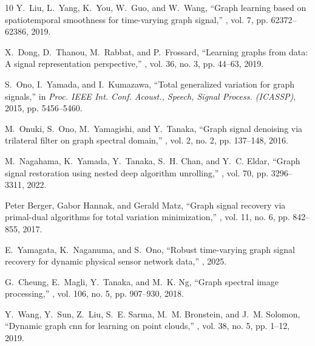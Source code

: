\documentclass[journal]{IEEEtran}
\begin{document}
\begin{thebibliography}{10}
    Y.~Liu, L.~Yang, K.~You, W.~Guo, and W.~Wang,
    \newblock ``Graph learning based on spatiotemporal smoothness for time-varying graph signal,''
    , vol. 7, pp. 62372--62386, 2019.
    
    X.~Dong, D.~Thanou, M.~Rabbat, and P.~Frossard,
    \newblock ``Learning graphs from data: A signal representation perspective,''
    , vol. 36, no. 3, pp. 44--63, 2019.
    
    S.~Ono, I.~Yamada, and I.~Kumazawa,
    \newblock ``Total generalized variation for graph signals,''
    \newblock in {\em Proc. IEEE Int. Conf. Acoust., Speech, Signal Process. (ICASSP)}, 2015, pp. 5456--5460.
    
    M.~Onuki, S.~Ono, M.~Yamagishi, and Y.~Tanaka,
    \newblock ``Graph signal denoising via trilateral filter on graph spectral domain,''
    , vol. 2, no. 2, pp. 137--148, 2016.
    
    M.~Nagahama, K.~Yamada, Y.~Tanaka, S.~H. Chan, and Y.~C. Eldar,
    \newblock ``Graph signal restoration using nested deep algorithm unrolling,''
    , vol. 70, pp. 3296--3311, 2022.
    
    Peter Berger, Gabor Hannak, and Gerald Matz,
    \newblock ``Graph signal recovery via primal-dual algorithms for total variation minimization,''
    , vol. 11, no. 6, pp. 842--855, 2017.
    
    E.~Yamagata, K.~Naganuma, and S.~Ono,
    \newblock ``Robust time-varying graph signal recovery for dynamic physical sensor network data,''
    , 2025.
    
    G.~Cheung, E.~Magli, Y.~Tanaka, and M.~K. Ng,
    \newblock ``Graph spectral image processing,''
    , vol. 106, no. 5, pp. 907--930, 2018.
    
    Y.~Wang, Y.~Sun, Z.~Liu, S.~E. Sarma, M.~M. Bronstein, and J.~M. Solomon,
    \newblock ``Dynamic graph cnn for learning on point clouds,''
    , vol. 38, no. 5, pp. 1--12, 2019.
    

\end{thebibliography}
\end{document}
